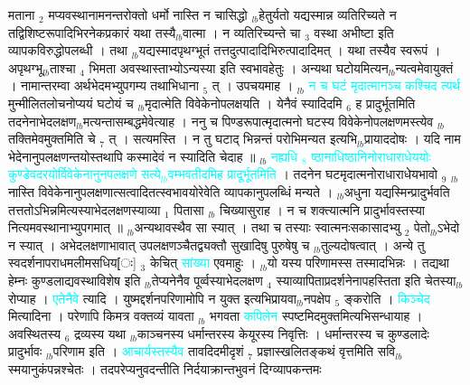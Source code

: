 \documentclass[article,12pt,a4paper]{memoir}%
\newcommand{\quotelemma}[1]{\textcolor{cyan}{#1}}
\begin{document}
 मताना {\tiny $_{2}$} मप्यवस्थानामनन्तरोक्तो धर्मो नास्ति न चासिद्धो {\tiny $_{lb}$}हेतुर्यतो यद्यस्मान्न व्यतिरिच्यते न तद्विशिष्टरूपादिभिरनेकप्रकारं यथा तस्यै{\tiny $_{lb}$}वात्मा । न व्यतिरिच्यन्ते चा {\tiny $_{3}$} वस्था अभीष्टा इति व्यापकविरुद्धोपलब्धी । तथा {\tiny $_{lb}$}यद्यस्मादपृथग्भूतं तत्तदुत्पादादिभिरुत्पादादिमत् । यथा तस्यैव स्वरूपं । अपृथग्भू{\tiny $_{lb}$}ताश्चा {\tiny $_{4}$} भिमता अवस्थास्ताभ्योऽन्यस्या इति स्वभावहेतुः । अन्यथा घटोयमित्यन{\tiny $_{lb}$}न्यत्वमेवायुक्तं । नामान्तरम्वा अर्थभेदमभ्युपगम्य तथाभिधाना {\tiny $_{5}$} त् । उपचयमाह । {\tiny $_{lb}$} \quotelemma{न च घटं मृदात्मानञ्च कश्चिद \cite[5a5]{vn-msN} त्यर्थ} मुन्मीलितलोचनोप्ययं घटोयं च {\tiny $_{lb}$}मृदात्मेति विवेकेनोपलक्षयति । येनैवं स्यादिदमि {\tiny $_{6}$} ह प्रादुर्भूतमिति तदनेनाभेदलक्षण{\tiny $_{lb}$}मत्यन्तासम्बद्धमेवेत्याह । ननु च पिण्डरूपात्मृदात्मनो घटस्य विवेकेनोपलक्षणमस्त्येव {\tiny $_{lb}$}तक्तिमेवमुक्तमिति चे {\tiny $_{7}$} त् । सत्यमस्ति । न तु घटाद् भिन्नन्तं परोभिमन्यत इत्यभि{\tiny $_{lb}$}प्रायाददोषः । यदि नाम भेदेनानुपलक्षणन्तयोस्तथापि कस्मादेवं न स्यादिति चेदाह ॥ {\tiny $_{lb}$} \quotelemma{नह्यधि {\tiny $_{8}$} ष्ठानाधिष्ठानिनोराधाराधेययोः कुण्डेवदरयोर्विवेकेनानुनपलक्षणे सत्ये{\tiny $_{lb}$}वम्भवतीदमिह प्रादूर्भूतमिति} \cite[4a6]{vn-msN} । तदनेन घटमृदात्मनोराधाराधेयभावो {\tiny $_{9}$} {\tiny $_{lb}$} \leavevmode{} नास्ति विवेकेनानुपलक्षणात्सत्वादितत्स्वभावयोरेवेति व्यापकानुपलब्धिं मन्यते । {\tiny $_{lb}$}अधुना यद्यस्मिन्प्रादुर्भवति तत्ततोऽभिन्नमित्यस्याभेदलक्षणस्याव्या {\tiny $_{1}$} पितासा {\tiny $_{lb}$} चिख्यासुराह । न च शक्त्यात्मनि प्रादुर्भावस्तस्या नित्यमवस्थानाभ्युपगमात् ॥ {\tiny $_{lb}$}अन्यथावस्थैव सा स्यात् । तथा च तस्याः स्वात्मनःसकासादभ्यु {\tiny $_{2}$} पेतो{\tiny $_{lb}$}ऽभेदो न स्यात् । अभेदलक्षणाभावात् उपलक्षणञ्चैतद्व्यक्तौ सुखादिषु पुरुषेषु च {\tiny $_{lb}$}तुल्यदोषत्वात् । अन्ये तु स्वदर्शनापराधमलीमसधिय[ः] {\tiny $_{3}$} केचित् \quotelemma{सांख्या} एवमाहुः । {\tiny $_{lb}$}यो यस्य परिणामस्स तस्मादभिन्नः । तद्यथा हेम्नः कुण्डलाद्यवस्थाविशेष इति {\tiny $_{lb}$}तेप्यनेनैव पूर्व्वस्याभेदलक्षण {\tiny $_{4}$} स्याव्यापिताप्रदर्शनेनापहस्तिता इति चेतस्या{\tiny $_{lb}$}रोप्याह । \quotelemma{एतेनैवे} \cite[5a6]{vn-msN} त्यादि । युष्मद्दर्शनपरिणामोपि न युक्त इत्यभिप्रायवा{\tiny $_{lb}$}नपक्षेप {\tiny $_{5}$} ङ्करोति । \quotelemma{किञ्चेद} \cite[5a7]{vn-msN} मित्यादिना । परेणापि किमत्र वक्तव्यं यावता {\tiny $_{lb}$} \leavevmode{} भगवता \quotelemma{कपिलेन} स्पष्टमिदमुक्तमित्यभिसन्धायाह । अवस्थितस्य {\tiny $_{6}$} द्रव्यस्य यथा {\tiny $_{lb}$}काञ्चनस्य धर्मान्तरस्य केयूरस्य निवृत्तिः । धर्मान्तरस्य च कुण्डलादेः प्रादुर्भावः {\tiny $_{lb}$}परिणाम इति । \quotelemma{आचार्यस्तस्यैव} तावदिदमीदृशं {\tiny $_{7}$} प्रज्ञास्खलितङ्कथं वृत्तमिति सवि{\tiny $_{lb}$}स्मयानुकंपन्नश्चेतः । तदपरेप्यनुवदन्तीति निर्दयाक्रान्तभुवनं दिग्व्यापकन्तमः 
\end{document}
